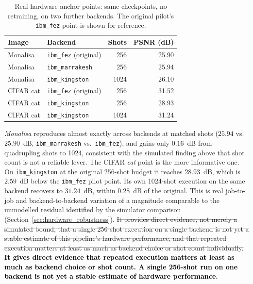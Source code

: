 \documentclass[pdflatex,sn-basic]{sn-jnl}
\newcommand{\del}[1]{\sout{#1}}
\newcommand{\add}[1]{\textbf{\textcolor{black}{#1}}}
\begin{document}
\begin{table}[t]
  \centering
  \caption{Real-hardware anchor points: same checkpoints, no retraining, on two
           further backends. The original pilot's \texttt{ibm\_fez} point is
           shown for reference.}
  \label{tab:hardware_anchors}
  \begin{tabular}{@{}l l r r@{}}
    \toprule
    Image       & Backend                       & Shots & PSNR (dB) \\
    \midrule
    Monalisa    & \texttt{ibm\_fez} (original)  &  256  & 25.90     \\
    Monalisa    & \texttt{ibm\_marrakesh}       &  256  & 25.94     \\
    Monalisa    & \texttt{ibm\_kingston}        & 1024  & 26.10     \\
    \addlinespace
    CIFAR cat   & \texttt{ibm\_fez} (original)  &  256  & 31.52     \\
    CIFAR cat   & \texttt{ibm\_kingston}        &  256  & 28.93     \\
    CIFAR cat   & \texttt{ibm\_kingston}        & 1024  & 31.24     \\
    \bottomrule
  \end{tabular}
\end{table}

\textit{Monalisa} reproduces almost exactly across backends at matched shots
($25.94$ vs.\ $25.90$~dB, \texttt{ibm\_marrakesh} vs.\ \texttt{ibm\_fez}), and
gains only $0.16$~dB from quadrupling shots to 1024, consistent with the
simulated finding above that shot count is not a reliable lever. The CIFAR
\textit{cat} point is the more informative one. On \texttt{ibm\_kingston} at the
original 256-shot budget it reaches $28.93$~dB, which is $2.59$~dB below the
\texttt{ibm\_fez} pilot point. Its own 1024-shot execution on the same backend
recovers to $31.24$~dB, within $0.28$~dB of the original. This is real
job-to-job and backend-to-backend variation of a magnitude comparable to the
unmodelled residual identified by the simulator comparison
(Section~\ref{sec:hardware_robustness}). \del{It provides direct evidence, not merely
a simulated bound, that a single 256-shot execution on a single backend is not
yet a stable estimate of this pipeline's hardware performance, and that repeated
execution matters at least as much as backend choice or shot count individually.}
\add{It gives direct evidence that repeated execution matters at least as much as
backend choice or shot count. A single 256-shot run on one backend is not yet a
stable estimate of hardware performance.}
\end{document}
